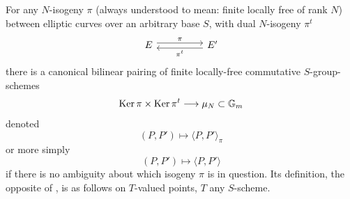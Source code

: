 \kmitem\label{item:2.8.1}
For any $N$-isogeny $\pi$ (always understood to mean: finite locally free of rank $N$) between elliptic curves over an arbitrary base $S$, with dual $N$-isogeny $\pi^t$
\[
\begin{tikzcd}[column sep=huge]
  E \arrow[r, shift left=0.6ex, "\pi"] & E' \arrow[l, shift left=0.6ex, "\pi^t"]
\end{tikzcd}
\]
there is a canonical bilinear pairing of finite locally-free commutative $S$-group-schemes
\setcounter{equation}{1}
\begin{equation}\label{eq:2.8.1.2}
\operatorname{Ker} \pi \times \operatorname{Ker} \pi^t \longrightarrow \mu_N \subset \mathbb{G}_m
\end{equation}
denoted
\begin{equation}\label{eq:2.8.1.3}
(P, P') \longmapsto \langle P, P' \rangle_\pi
\end{equation}
or more simply
\[
(P, P') \longmapsto \langle P, P' \rangle
\]
if there is no ambiguity about which isogeny $\pi$ is in question. Its definition, the opposite of \cite[pp.~66--67]{Oda}, is as follows on $T$-valued points, $T$ any $S$-scheme.

